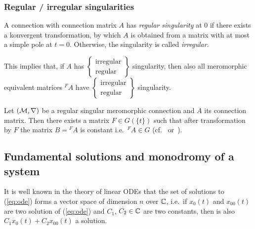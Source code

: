 \subsubsection{Regular / irregular singularities}
\begin{defn}
  A connection with connection matrix $A$ has \emph{regular singularity} at $0$
  if there exists a konvergent transformation, by which $A$ is obtained from a
  matrix with at most a simple pole at $t=0$.
  Otherwise, the singularity is called \emph{irregular}.
  \begin{s-rem}
    This implies that, if $A$ has
    $\left\{\substack{\text{irregular}\\\text{regular}}\right\}$
    singularity, then also all
    meromorphic equivalent matrices ${}^{F}\!A$ have
    $\left\{\substack{\text{irregular}\\\text{regular}}\right\}$
    singularity.
  \end{s-rem}
  \begin{comment}
    \begin{s-rem}
      \marginnote{\cite[150]{van2003galois}}
      One can express this notion of regular singular also in terms of
      $\delta:=t\frac{d}{dt}$. A system has regular singularity if it is
      equivalent to an equation $\delta-A$ where $A$ has entries in
      holomorphic functions in a neighbourhood of $z=0$.
    \end{s-rem}
  \end{comment}
\end{defn}
\begin{thm}
  Let $(\mathcal{M},\nabla)$ be a regular singular meromorphic connection and $A$ its
  connection matrix.
  Then there exists a matrix $F\in G(\!\{t\}\!)$ such that after transformation
  by $F$ the matrix $B={}^F\!A$ is constant i.e.\ ${}^F\!A\in G$
  (cf.~\cite[Thm.II.2.8]{sabbah2007isomonodromic}
  or~\cite[Sec.5.1.2]{hotta2008}).
\end{thm}

\subsection{Fundamental solutions and monodromy of a system}
It is well known in the theory of linear ODEs that the set of solutions to
(\ref{eq:ode}) forms a vector space of dimension $n$ over $\mathbb{C}$, i.e.\ if
$x_0(t)$ and $x_{00}(t)$ are two solution of (\ref{eq:ode}) and $C_1$,
$C_2\in\mathbb{C}$ are two constants, then is also $C_1x_0(t)+C_2x_{00}(t)$ a solution.

